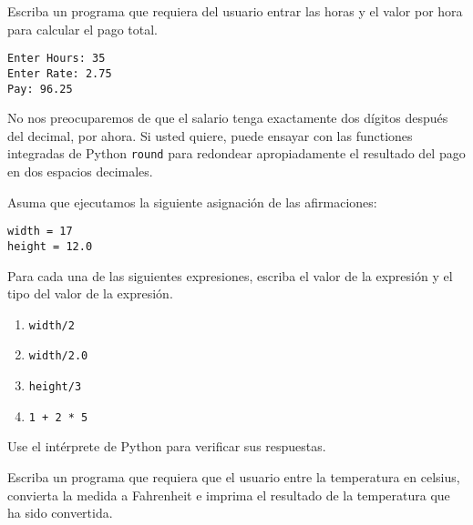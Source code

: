 
\begin{ex}

Escriba un programa que requiera del usuario entrar las horas y el valor por hora para calcular el pago total.


\begin{verbatim}
Enter Hours: 35
Enter Rate: 2.75
Pay: 96.25
\end{verbatim}
\end{ex}
%

No nos preocuparemos de que el salario tenga exactamente dos d\'igitos despu\'es del decimal, por ahora. Si usted quiere, puede ensayar con las functiones integradas de Python {\tt round} para redondear apropiadamente el resultado del pago en dos espacios decimales.

\begin{ex}
Asuma que ejecutamos la siguiente asignaci\'on de las afirmaciones:





\begin{verbatim}
width = 17
height = 12.0
\end{verbatim}


Para cada una de las siguientes expresiones, escriba el valor de la expresi\'on y el tipo del valor de la expresi\'on.



\begin{enumerate}

\item {\tt width/2}

\item {\tt width/2.0}

\item {\tt height/3}

\item {\tt 1 + 2 * 5}

\end{enumerate}


Use el int\'erprete de Python para verificar sus respuestas.
\end{ex}

\begin{ex}
Escriba un programa que requiera que el usuario entre la temperatura en celsius,
convierta la medida a Fahrenheit e imprima el resultado de la temperatura que ha sido convertida.



\end{ex}


